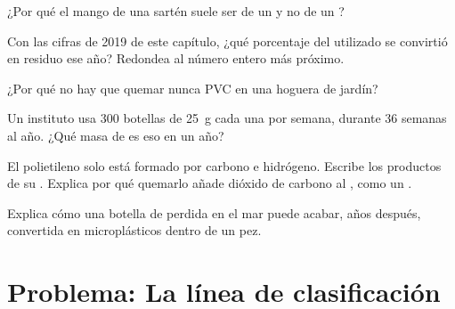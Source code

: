 \begin{exercise}[$\star\star$]\label{exo:g8:plastics:7}
¿Por qué el mango de una sartén suele ser de un  y no de un
?
\end{exercise}

\begin{exercise}[$\star\star$]\label{exo:g8:plastics:8}
Con las cifras de 2019 de este capítulo, ¿qué porcentaje del 
utilizado se convirtió en residuo ese año? Redondea al número entero más
próximo.
\end{exercise}

\begin{exercise}[$\star\star$]\label{exo:g8:plastics:9}
¿Por qué no hay que quemar nunca PVC en una hoguera de jardín?
\end{exercise}

\begin{exercise}[$\star\star$]\label{exo:g8:plastics:10}
Un instituto usa 300 botellas de \qty{25}{g} cada una por semana,
durante 36 semanas al año. ¿Qué masa de  es eso en un año?
\end{exercise}

\begin{exercise}[$\star\star\star$]\label{exo:g8:plastics:11}
El polietileno solo está formado por carbono e hidrógeno. Escribe los
productos de su . Explica por qué quemarlo añade
dióxido de carbono al , como un .
\end{exercise}

\begin{exercise}[$\star\star\star$]\label{exo:g8:plastics:12}
Explica cómo una botella de  perdida en el mar puede acabar,
años después, convertida en microplásticos dentro de un pez.
\end{exercise}

\section{Problema: La línea de clasificación}

